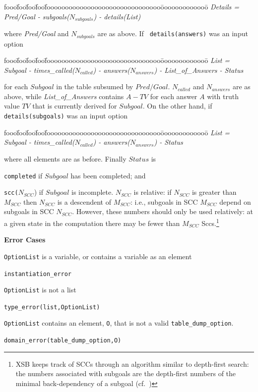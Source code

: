 \begin{description}
\begin{tabbing}
fooo\=foo\=foo\=foo\=fooooooooooooooooooooooooooooooo\=ooooooooooooo\=\kill
%
{\em   Details = } \\
\> {\em Pred/Goal  - subgoals($N_{subgoals}$) - details(List)}
%
\end{tabbing}
%
where {\em Pred/Goal} and $N_{subgoals}$ are as above.  If {\tt
  details(answers)} was an input option
%
\begin{tabbing}
fooo\=foo\=foo\=foo\=fooooooooooooooooooooooooooooooo\=ooooooooooooo\=\kill
%
{\em List = }\\
\>  {\em Subgoal - times\_called($N_{called}$) - answers($N_{answers}$) - List\_of\_Answers - Status}
%
\end{tabbing}
%
for each $Subgoal$ in the table subsumed by $Pred/Goal$.  $N_{called}$
and $N_{answers}$ are as above, while {\em List\_of\_Answers} contains
$A-TV$ for each answer $A$ with truth value $TV$ that is currently
derived for $Subgoal$.  On the other hand, if {\tt details(subgoals)}
was an input option
\begin{tabbing}
fooo\=foo\=foo\=foo\=fooooooooooooooooooooooooooooooo\=ooooooooooooo\=\kill
%
{\em List = }\\
\>  {\em Subgoal - times\_called($N_{called}$) - answers($N_{answers}$) - Status}
%
\end{tabbing}
%
where all elements are as before.  Finally $Status$ is
%
\bi
\item {\tt completed} if $Subgoal$ has been completed; and
%
\item {\tt scc($N_{SCC}$}) if $Subgoal$ is incomplete.  $N_{SCC}$ is
  relative: if $N_{SCC}$ is greater than $M_{SCC}$ then $N_{SCC}$ is a
  descendent of $M_{SCC}$: i.e., subgoals in SCC $M_{SCC}$ depend on
  subgoals in SCC $N_{SCC}$.  However, these numbers should only be
  used relatively: at a given state in the computation there may be
  fewer than $M_{SCC}$ Sccs.\footnote{XSB keeps track of SCCs through
    an algorithm similar to depth-first search: the numbers associated
    with subgoals are the depth-first numbers of the minimal
    back-dependency of a subgoal (cf.~\cite{SaSw98})}
\ei


{\bf Error Cases}
\bi
\item {\tt OptionList} is a variable, or contains a variable as an element
\bi
\item {\tt instantiation\_error}
\ei
\item {\tt OptionList} is not a list
\bi
\item {\tt type\_error(list,OptionList)}
\ei
\item {\tt OptionList} contains an element, {\tt O}, that is not a
  valid {\tt table\_dump\_option}.
\bi
\item {\tt domain\_error(table\_dump\_option,O)}
\ei
\ei
\end{description}

